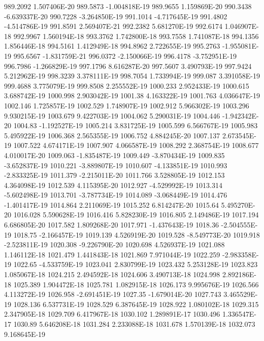 989.2092  1.507406E-20
989.5873  -1.004818E-19
989.9655  1.159869E-20
990.3438  -6.639337E-20
990.7228  -3.264850E-19
991.1014  -4.717645E-19
991.4802  -4.514786E-19
991.8591  2.569407E-21
992.2382  5.681270E-19
992.6174  1.046907E-18
992.9967  1.560194E-18
993.3762  1.742800E-18
993.7558  1.741087E-18
994.1356  1.856446E-18
994.5161  1.412949E-18
994.8962  2.722655E-19
995.2763  -1.955081E-19
995.6567  -1.831759E-21
996.0372  -2.150066E-19
996.4178  -3.752951E-19
996.7986  -1.266829E-19
997.1796  8.616287E-20
997.5607  3.490793E-19
997.9424  5.212962E-19
998.3239  3.378111E-19
998.7054  1.733994E-19
999.087  3.391058E-19
999.4688  3.775079E-19
999.8508  2.255552E-19
1000.233  2.952433E-19
1000.615  3.688742E-19
1000.998  2.903042E-19
1001.38  4.163322E-19
1001.763  4.036647E-19
1002.146  1.725857E-19
1002.529  1.748907E-19
1002.912  5.966302E-19
1003.296  9.930215E-19
1003.679  9.422703E-19
1004.062  5.290031E-19
1004.446  -1.942342E-20
1004.83  -1.192527E-19
1005.214  3.831725E-19
1005.599  6.566767E-19
1005.983  5.495922E-19
1006.368  2.565355E-19
1006.752  4.884245E-20
1007.137  2.673545E-19
1007.522  4.674171E-19
1007.907  4.066587E-19
1008.292  2.368754E-19
1008.677  4.010017E-20
1009.063  -1.835487E-19
1009.449  -3.870434E-19
1009.835  -3.652837E-19
1010.221  -3.889807E-19
1010.607  -4.133851E-19
1010.993  -2.833325E-19
1011.379  -2.215011E-20
1011.766  3.528805E-19
1012.153  4.364098E-19
1012.539  4.115395E-20
1012.927  -4.529992E-19
1013.314  -5.602498E-19
1013.701  -3.787734E-19
1014.089  -3.068449E-19
1014.476  -1.401417E-19
1014.864  2.211069E-19
1015.252  6.814247E-20
1015.64  5.495270E-20
1016.028  5.590628E-19
1016.416  5.828230E-19
1016.805  2.149486E-19
1017.194  6.686805E-20
1017.582  1.809268E-20
1017.971  -1.437643E-19
1018.36  -2.504555E-19
1018.75  -2.166457E-19
1019.139  4.526919E-20
1019.528  -8.549773E-20
1019.918  -2.523811E-19
1020.308  -9.226790E-20
1020.698  4.526937E-19
1021.088  1.146112E-18
1021.479  1.441843E-18
1021.869  7.971044E-19
1022.259  -2.983358E-19
1022.65  -4.533759E-19
1023.041  2.830799E-19
1023.432  5.253128E-19
1023.823  1.085067E-18
1024.215  2.494592E-18
1024.606  3.490713E-18
1024.998  2.892186E-18
1025.389  1.904472E-18
1025.781  1.082915E-18
1026.173  9.995676E-19
1026.566  4.113272E-19
1026.958  -2.691451E-19
1027.35  -1.679014E-20
1027.743  3.465529E-19
1028.136  6.537731E-19
1028.529  6.387645E-19
1028.922  1.080102E-18
1029.315  2.347905E-18
1029.709  6.417967E-18
1030.102  1.289891E-17
1030.496  1.336547E-17
1030.89  5.646208E-18
1031.284  2.233088E-18
1031.678  1.570139E-18
1032.073  9.168645E-19
